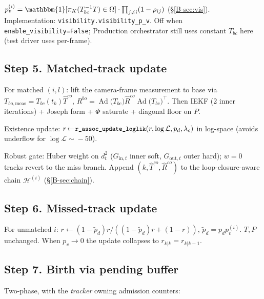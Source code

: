 \documentclass[11pt]{article}
\newcommand{\ind}{\mathbbm{1}}
\newcommand{\Ad}[1]{\operatorname{Ad}\!\bigl(#1\bigr)}
\newcommand{\code}[1]{\texttt{\small #1}}
\begin{document}
$p_v^{(i)}=\ind[\pi_K(T_{bc}^{-1}T)\in\Omega]\cdot\prod_{j\ne i}(1-\rho_{ij})$
(\S\ref{B-sec:vis}). Implementation: \code{visibility.visibility\_p\_v}.
Off when \code{enable\_visibility=False}; Production orchestrator still
uses constant $T_{bc}$ here (test driver uses per-frame).

\subsection{Step 5. Matched-track update}\label{sec:match}

For matched $(i,l)$: lift the camera-frame measurement to base via
$T_{bo,\text{meas}}=T_{bc}(t_k)\hat T^{co}$,
$R^{bo}=\Ad{T_{bc}}\hat R^{co}\Ad{T_{bc}}^{\!\top}$. Then IEKF (2 inner
iterations) + Joseph form + $\Phi$ saturate + diagonal floor on $P$.

Existence update: $r\!\leftarrow\!\code{r\_assoc\_update\_loglik}(r,\log\mathcal L,p_d,\lambda_c)$
in log-space (avoids underflow for $\log\mathcal L\!\sim\!-50$).

Robust gate: Huber weight on $d^2_t$ ($G_{\text{in},t}$ inner soft, $G_{\text{out},t}$ outer hard); $w=0$ tracks
revert to the miss branch. Append $(k,\hat T^{co},\hat R^{co})$ to the
loop-closure-aware chain $\mathcal H^{(i)}$ (\S\ref{B-sec:chain}).

\subsection{Step 6. Missed-track update}\label{sec:miss}

For unmatched $i$: $r\!\leftarrow\!(1-\tilde p_d)r/((1-\tilde p_d)r+(1-r))$,
$\tilde p_d=p_d p_v^{(i)}$. $T,P$ unchanged. When $p_v\!\to\!0$ the update collapses to
$r_{k|k}=r_{k|k-1}$.

\subsection{Step 7. Birth via pending buffer}\label{sec:birth}

Two-phase, with the \emph{tracker} owning admission counters:
\end{document}
